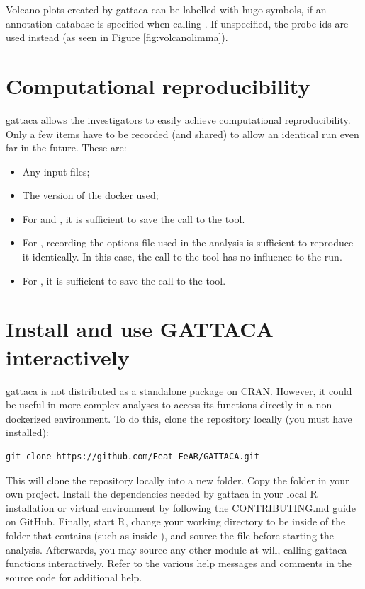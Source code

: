 Volcano plots created by \gls{gattaca} can be labelled with \gls{hugo} symbols, if an annotation database is specified when calling . If unspecified, the probe ids are used instead (as seen in Figure \ref{fig:volcanolimma}).


\section{Computational reproducibility}
\gls{gattaca} allows the investigators to easily achieve computational reproducibility. Only a few items have to be recorded (and shared) to allow an identical run even far in the future. These are:
\begin{itemize}
    \item Any input files;
    \item The version of the docker used;
    \item For  and , it is sufficient to save the call to the tool.
    \item For , recording the options file used in the analysis is sufficient to reproduce it identically. In this case, the call to the tool has no influence to the run.
    \item For , it is sufficient to save the call to the tool.
\end{itemize}

\section{Install and use GATTACA interactively}
\label{localGATTA}
\gls{gattaca} is not distributed as a standalone package on CRAN. However, it could be useful in more complex analyses to access its functions directly in a non-dockerized environment. To do this, clone the repository locally (you must have  installed):
\begin{lstlisting}
git clone https://github.com/Feat-FeAR/GATTACA.git
\end{lstlisting}
This will clone the repository locally into a new  folder. Copy the  folder in your own project. Install the dependencies needed by \gls{gattaca} in your local R installation or virtual environment by \href{https://github.com/Feat-FeAR/GATTACA/blob/main/CONTRIBUTING.md}{following the CONTRIBUTING.md guide} on GitHub. Finally, start R, change your working directory to be inside of the folder that contains  (such as inside ), and source the  file before starting the analysis.
Afterwards, you may source any other module at will, calling \gls{gattaca} functions interactively. Refer to the various help messages and comments in the source code for additional help.

